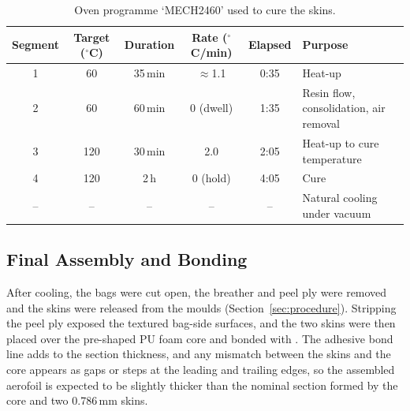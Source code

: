 \begin{table}[htbp]
    \addedfloat
    \centering
    \caption{Oven programme `MECH2460' used to cure the skins.}
    \label{tab:cure}
    \small
    \renewcommand{\arraystretch}{1.1}
    \begin{tabular}{@{}cccccl@{}}
        \toprule
        \textbf{Segment} & \textbf{Target} ($^\circ$C) & \textbf{Duration}
        & \textbf{Rate} ($^\circ$C/min) & \textbf{Elapsed} & \textbf{Purpose} \\
        \midrule
        1 & 60 & 35\,min & $\approx$1.1 & 0:35 & Heat-up \\
        2 & 60 & 60\,min & 0 (dwell) & 1:35 & Resin flow, consolidation, air removal \\
        3 & 120 & 30\,min & 2.0 & 2:05 & Heat-up to cure temperature \\
        4 & 120 & 2\,h & 0 (hold) & 4:05 & Cure \\
        -- & -- & -- & -- & -- & Natural cooling under vacuum \\
        \bottomrule
    \end{tabular}
\end{table}

\begin{addedblock}
\subsection{Final Assembly and Bonding}

After cooling, the bags were cut open, the breather and peel ply were
removed and the skins were released from the moulds
(Section~\ref{sec:procedure}). Stripping the peel ply exposed the
textured bag-side surfaces, and the two skins were then placed over the
pre-shaped PU foam core and bonded with 
. The adhesive bond line adds to the section thickness, and
any mismatch between the skins and the core appears as gaps or steps
at the leading and trailing edges, so the assembled aerofoil is
expected to be slightly thicker than the nominal section formed by the
core and two 0.786\,mm skins.
\end{addedblock}
